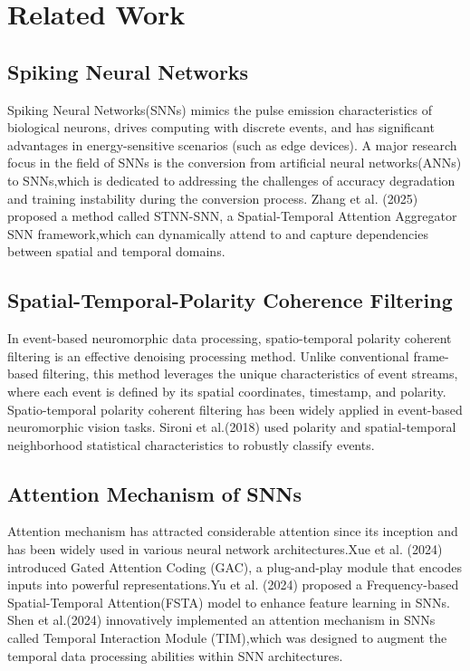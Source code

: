 \documentclass[conference]{IEEEtran}
\begin{document}
\section{Related Work}
\subsection{Spiking Neural Networks}
Spiking Neural Networks(SNNs) mimics the pulse emission characteristics of biological neurons, drives computing with discrete events, and has significant advantages in energy-sensitive scenarios (such as edge devices).\cite{roy2019towards} A major research focus in the field of SNNs is the conversion from artificial neural networks(ANNs) to SNNs\cite{rueckauer2017conversion},which is dedicated to addressing the challenges of accuracy degradation and training instability during the conversion process.\cite{han2020rmp} Zhang et al. (2025) proposed a method called STNN-SNN, a Spatial-Temporal Attention Aggregator SNN framework,which can dynamically attend to and capture dependencies between spatial and temporal domains.\cite{zhang2025}

\subsection{Spatial-Temporal-Polarity Coherence Filtering}
In event-based neuromorphic data processing, spatio-temporal polarity coherent filtering is an effective denoising processing method. Unlike conventional frame-based filtering, this method leverages the unique characteristics of event streams, where each event is defined by its spatial coordinates, timestamp, and polarity. Spatio-temporal polarity coherent filtering has been widely applied in event-based neuromorphic vision tasks. Sironi et al.(2018) used polarity and spatial-temporal neighborhood statistical characteristics to robustly classify events.\cite{8578284} 

\subsection{Attention Mechanism of SNNs}
Attention mechanism has attracted considerable attention since its inception and has been widely used in various neural network architectures.Xue et al. (2024) introduced Gated Attention Coding (GAC)\cite{qiu2024}, a plug-and-play module that encodes inputs into powerful representations.Yu et al. (2024) proposed a Frequency-based Spatial-Temporal Attention(FSTA) model to enhance feature learning in SNNs.\cite{yu2025}  Shen et al.(2024) innovatively implemented an attention mechanism in SNNs called Temporal Interaction Module (TIM),which was designed to augment the temporal data processing abilities within SNN architectures.\cite{shen2024}
\end{document}
